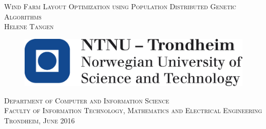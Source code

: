 \begin{titlepage}
 \vspace*{\fill}
    \begin{center}
    {\Huge \scshape \Large Wind Farm Layout Optimization using Population Distributed Genetic Algorithms}\\[0.5cm]
      {      \scshape Helene Tangen }
     \end{center}
	\vspace*{3cm}
    \begin{figure}[h!]
    \centering
    \includegraphics[scale=0.3]{images/ntnu/logo}
    \end{figure}
    \begin{center}
    \scshape Department of Computer and Information Science \\
    \scshape Faculty of Information Technology, Mathematics and Electrical Engineering\\
  	\normalfont Trondheim, June 2016
    \end{center}
   \vspace*{\fill}

\end{titlepage}
